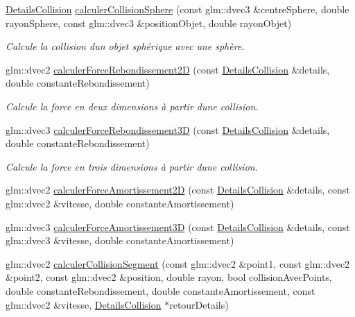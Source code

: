 \begin{DoxyCompactItemize}
\hyperlink{classaidecollision_1_1_details_collision}{Details\+Collision} \hyperlink{namespaceaidecollision_afb42c7c2bd75a26500296a5d48cc34f2}{calculer\+Collision\+Sphere} (const glm\+::dvec3 \&centre\+Sphere, double rayon\+Sphere, const glm\+::dvec3 \&position\+Objet, double rayon\+Objet)
\begin{DoxyCompactList}\small\item\em Calcule la collision d\textquotesingle{}un objet sphérique avec une sphère. \end{DoxyCompactList}\item 
glm\+::dvec2 \hyperlink{namespaceaidecollision_a6c62a46261f0a8dbb568ab7f620f2f16}{calculer\+Force\+Rebondissement2\+D} (const \hyperlink{classaidecollision_1_1_details_collision}{Details\+Collision} \&details, double constante\+Rebondissement)
\begin{DoxyCompactList}\small\item\em Calcule la force en deux dimensions à partir d\textquotesingle{}une collision. \end{DoxyCompactList}\item 
glm\+::dvec3 \hyperlink{namespaceaidecollision_adaff1cd85032a877a7cae37f948e7f99}{calculer\+Force\+Rebondissement3\+D} (const \hyperlink{classaidecollision_1_1_details_collision}{Details\+Collision} \&details, double constante\+Rebondissement)
\begin{DoxyCompactList}\small\item\em Calcule la force en trois dimensions à partir d\textquotesingle{}une collision. \end{DoxyCompactList}\item 
glm\+::dvec2 \hyperlink{namespaceaidecollision_aba912d7b8b6e2f274c56b8ed74a98294}{calculer\+Force\+Amortissement2\+D} (const \hyperlink{classaidecollision_1_1_details_collision}{Details\+Collision} \&details, const glm\+::dvec2 \&vitesse, double constante\+Amortissement)
\item 
glm\+::dvec3 \hyperlink{namespaceaidecollision_a126c9fdb84004900df0a81728d91d08b}{calculer\+Force\+Amortissement3\+D} (const \hyperlink{classaidecollision_1_1_details_collision}{Details\+Collision} \&details, const glm\+::dvec3 \&vitesse, double constante\+Amortissement)
\item 
glm\+::dvec2 \hyperlink{namespaceaidecollision_accd9249f53427a1eb943b9ce006c4d9b}{calculer\+Collision\+Segment} (const glm\+::dvec2 \&point1, const glm\+::dvec2 \&point2, const glm\+::dvec2 \&position, double rayon, bool collision\+Avec\+Points, double constante\+Rebondissement, double constante\+Amortissement, const glm\+::dvec2 \&vitesse, \hyperlink{classaidecollision_1_1_details_collision}{Details\+Collision} $\ast$retour\+Details)

\end{DoxyCompactItemize}
